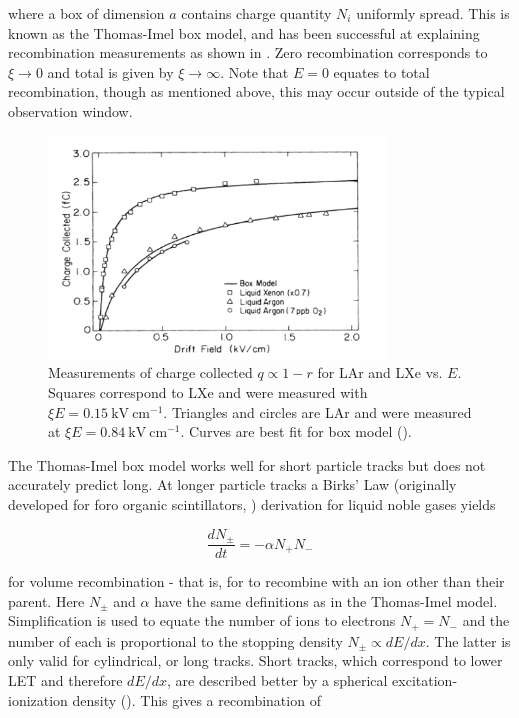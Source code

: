 \noindent where a box of dimension $a$ contains charge quantity $N_{i}$ uniformly spread.  This is known as the Thomas-Imel box model,
and has been successful at explaining recombination measurements as shown in .  Zero recombination corresponds to
$\xi \rightarrow 0$ and total is given by $\xi \rightarrow \infty$.  Note that $E = 0$ equates to total recombination, though as
mentioned above, this may occur outside of the typical observation window.

\begin{figure}
\includegraphics[width=0.8\textwidth]{TIRecombination}
\caption{Measurements of charge collected $q \propto 1 - r$ for LAr and LXe vs. $E$.  Squares correspond to LXe and were measured with
$\xi E = 0.15\ \mathrm{kV\ cm^{-1}}$.  Triangles and circles are LAr and were measured at $\xi E = 0.84\ \mathrm{kV\ cm^{-1}}$.  Curves
are best fit for box model ().}
\label{fig:ti_recomb}
\end{figure}

The Thomas-Imel box model works well for short particle tracks but does not accurately predict long.  At longer particle tracks a Birks'
Law (originally developed for foro organic scintillators, ) derivation for liquid noble gases yields

\begin{equation}
\frac{dN_{\pm}}{dt} = -\alpha N_{+} N_{-}
\label{eq:birks_diff}
\end{equation}

\noindent for volume recombination - that is, for \electron to recombine with an ion other than their parent.  Here $N_{\pm}$ and
$\alpha$ have the same definitions as in the Thomas-Imel model.  Simplification is used to equate the number of ions to electrons
$N_{+} = N_{-}$ and the number of each is proportional to the stopping density $N_{\pm} \propto dE/dx$.  The latter is only valid for
cylindrical, or long tracks.  Short tracks, which correspond to lower LET and therefore $dE/dx$, are described better by a spherical
excitation-ionization density ().  This gives a recombination of

